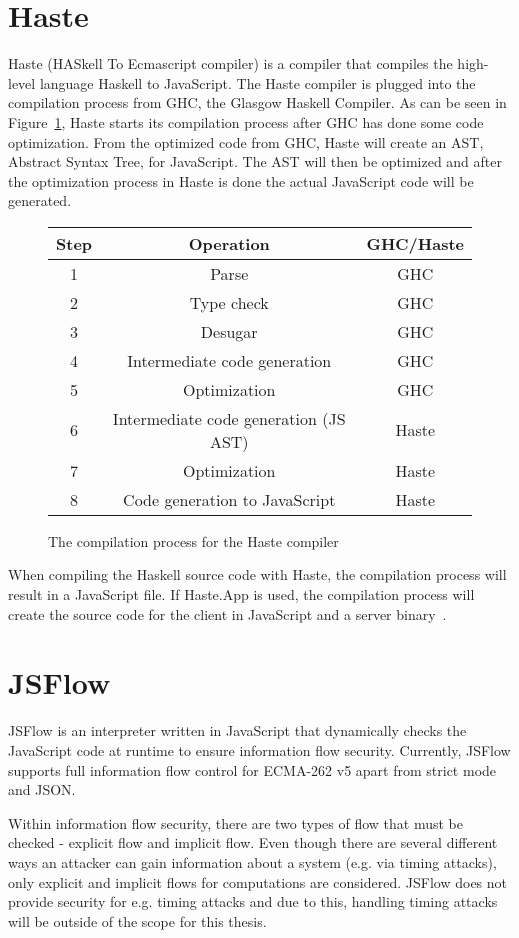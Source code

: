 \section{Haste}
Haste (HASkell To Ecmascript compiler) is a compiler that compiles the high-level language Haskell to JavaScript. The Haste compiler is plugged into the compilation process from GHC, the Glasgow Haskell Compiler. As can be seen in Figure~\ref{fig:system}, Haste starts its compilation process after GHC has done some code optimization. From the optimized code from GHC, Haste will create an AST, Abstract Syntax Tree, for JavaScript. The AST will then be optimized and after the optimization process in Haste is done the actual JavaScript code will be generated.
\begin{figure}[h]
  \begin{tabular}{|c|c|c|}
    \hline
    Step & Operation & GHC/Haste \\
    \hline
    1 & Parse & GHC \\
    2 & Type check & GHC \\
    3 & Desugar & GHC \\
    4 & Intermediate code generation & GHC \\
    5 & Optimization & GHC \\
    6 & Intermediate code generation (JS AST) & Haste \\
    7 & Optimization & Haste \\
    8 & Code generation to JavaScript & Haste \\
    \hline
  \end{tabular}
  \caption{The compilation process for the Haste compiler}
  \label{fig:system}
\end{figure}

When compiling the Haskell source code with Haste, the compilation process will result in a JavaScript file. If Haste.App is used, the compilation process will create the source code for the client in JavaScript and a server binary~\cite{haste-symposium}.

\section{JSFlow}
JSFlow is an interpreter written in JavaScript that dynamically checks the JavaScript code at runtime to ensure information flow security. Currently, JSFlow supports full information flow control for ECMA-262 v5 apart from strict mode and JSON.

Within information flow security, there are two types of flow that must be checked - explicit flow and implicit flow. Even though there are several different ways an attacker can gain information about a system (e.g. via timing attacks), only explicit and implicit flows for computations are considered. JSFlow does not provide security for e.g. timing attacks and due to this, handling timing attacks will be outside of the scope for this thesis.
